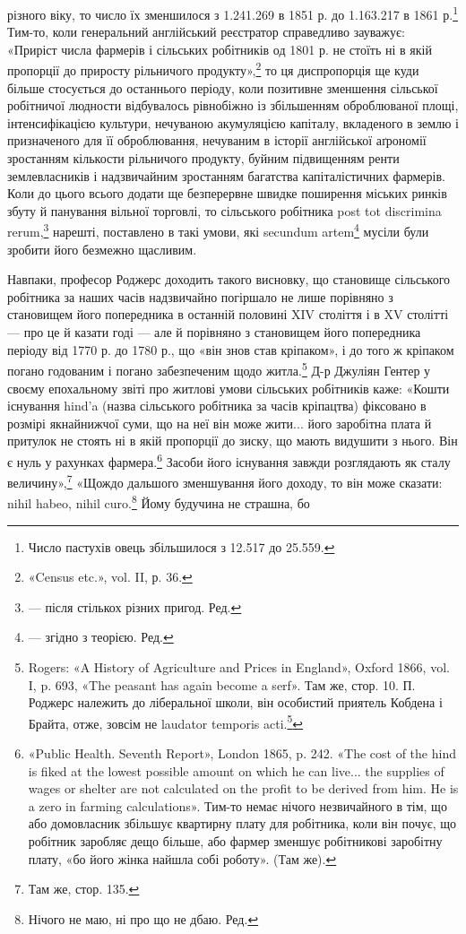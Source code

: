 \parcont{}  %
різного віку, то число їх зменшилося з 1.241.269 в 1851 р. до
1.163.217 в 1861 р.\footnote{
Число пастухів овець збільшилося з 12.517 до 25.559.
} Тим-то, коли генеральний англійський
реєстратор справедливо зауважує: «Приріст числа фармерів і
сільських робітників од 1801 р. не стоїть ні в якій пропорції
до приросту рільничого продукту»,\footnote{
«Census etc.», vol. II, р. 36.
} то ця диспропорція ще
куди більше стосується до останнього періоду, коли позитивне
зменшення сільської робітничої людности відбувалось рівнобіжно
із збільшенням оброблюваної площі, інтенсифікацією культури,
нечуваною акумуляцією капіталу, вкладеного в землю і призначеного
для її оброблювання, нечуваним в історії англійської
аґрономії зростанням кількости рільничого продукту, буйним
підвищенням ренти землевласників і надзвичайним зростанням
багатства капіталістичних фармерів. Коли до цього всього додати
ще безперервне швидке поширення міських ринків збуту й
панування вільної торговлі, то сільського робітника post tot
discrimina rerum,\footnote*{
— після стількох різних пригод. Ред.
} нарешті, поставлено в такі умови, які secundum
artem\footnote*{
— згідно з теорією. Ред.
} мусіли були зробити його безмежно щасливим.

Навпаки, професор Роджерс доходить такого висновку, що
становище сільського робітника за наших часів надзвичайно
погіршало не лише порівняно з становищем його попередника
в останній половині XIV століття і в XV столітті — про це й
казати годі — але й порівняно з становищем його попередника
періоду від 1770 р. до 1780 р., що «він знов став кріпаком», і
до того ж кріпаком погано годованим і погано забезпеченим щодо
житла.\footnote{
Rogers: «A History of Agriculture and Prices in England», Oxford
1866, vol. I, p. 693, «The peasant has again become a serf». Там же, стор. 10.
П. Роджерс належить до ліберальної школи, він особистий приятель
Кобдена і Брайта, отже, зовсім не laudator temporis acti.\footnote*{
— хвалій минулих часів. Ред.
}
} Д-р Джуліян Гентер у своєму епохальному звіті про
житлові умови сільських робітників каже: «Кошти існування
hind’a (назва сільського робітника за часів кріпацтва) фіксовано
в розмірі якнайнижчої суми, що на неї він може жити... його
заробітна плата й притулок не стоять ні в якій пропорції до зиску,
що мають видушити з нього. Він є нуль у рахунках фармера.\footnote{
«Public Health. Seventh Report», London 1865, p. 242. «The cost of
the hind is fiked at the lowest possible amount on which he can live... the
supplies of wages or shelter are not calculated on the profit to be derived
from him. He is a zero in farming calculations». Тим-то немає нічого незвичайного
в тім, що або домовласник збільшує квартирну плату для робітника,
коли він почує, що робітник заробляє дещо більше, або фармер
зменшує робітникові заробітну плату, «бо його жінка найшла собі
роботу». (Там же).
}
Засоби його існування завжди розглядають як сталу величину»,\footnote{
Там же, стор. 135.
}
«Щождо дальшого зменшування його доходу, то він може сказати:
nihil habeo, nihil curo.\footnote*{
Нічого не маю, ні про що не дбаю. Ред.
} Йому будучина не страшна, бо
\parbreak{}  %
